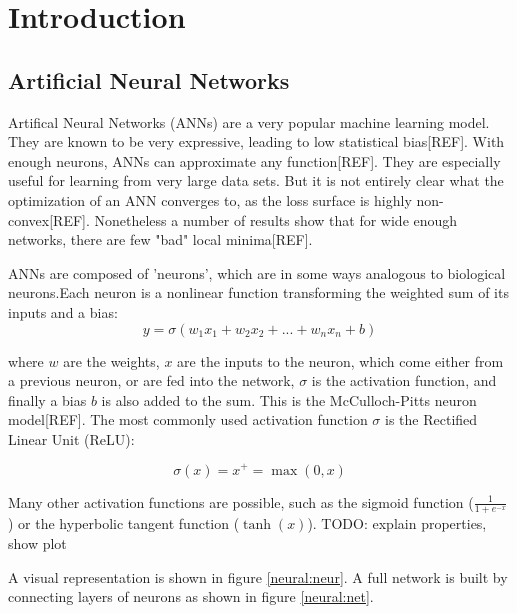 \chapter{Introduction}
\section{Artificial Neural Networks}

Artifical Neural Networks (ANNs) are a very popular machine learning model. They are known to be very expressive, leading to low statistical bias[REF]. With enough neurons, ANNs can approximate any function[REF].  They are especially useful for learning from very large data sets. But it is not entirely clear what the optimization of an ANN converges to, as the loss surface is highly non-convex[REF]. Nonetheless a number of results show that for wide enough networks, there are few "bad" local minima[REF].

ANNs are composed of 'neurons', which are in some ways analogous to biological neurons.Each neuron is a nonlinear function transforming the weighted sum of its inputs and a bias:
\begin{equation}
      y = \sigma(w_1x_1+w_2x_2+...+w_nx_n + b)
\end{equation}

where $w$ are the weights, $x$ are the inputs to the neuron, which come either from a previous neuron, or are fed into the network, $\sigma$ is the activation function, and finally a bias $b$ is also added to the sum. This is the McCulloch-Pitts neuron model[REF]. The most commonly used activation function $\sigma$ is the Rectified Linear Unit (ReLU):

\begin{equation}
      \sigma(x) = x^+ = \max(0,x)
\end{equation}

Many other activation functions are possible, such as the sigmoid function ($\frac{1}{1+e^{-x}}$) or the hyperbolic tangent function ($\tanh(x)$). TODO: explain properties, show plot

A visual representation is shown in figure \ref{neural:neur}. A full network is built by connecting layers of neurons as shown in figure \ref{neural:net}.




